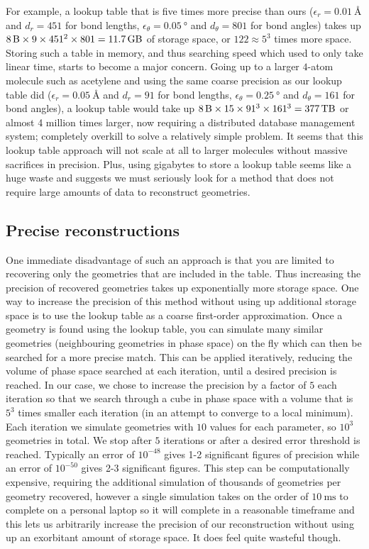 For example, a lookup table that is five times more precise than ours ($\epsilon_r = \SI{0.01}{\angstrom}$ and $d_r = 451$ for bond lengths, $\epsilon_\theta = \SI{0.05}{\degree}$ and $d_\theta = 801$ for bond angles) takes up $\SI{8}{\byte} \times 9 \times 451^2 \times 801 = \SI{11.7}{\giga\byte}$ of storage space, or $122 \approx 5^3$ times more space. Storing such a table in memory, and thus searching speed which used to only take linear time, starts to become a major concern. Going up to a larger $4$-atom molecule such as acetylene and using the same coarse precision as our lookup table did ($\epsilon_r = \SI{0.05}{\angstrom}$ and $d_r = 91$ for bond lengths, $\epsilon_\theta = \SI{0.25}{\degree}$ and $d_\theta = 161$ for bond angles), a lookup table would take up $\SI{8}{\byte} \times 15 \times 91^3 \times 161^3 = \SI{377}{\tera\byte}$ or almost 4 million times larger, now requiring a distributed database management system; completely overkill to solve a relatively simple problem. It seems that this lookup table approach will not scale at all to larger molecules without massive sacrifices in precision. Plus, using gigabytes to store a lookup table seems like a huge waste and suggests we must seriously look for a method that does not require large amounts of data to reconstruct geometries.

\subsection{Precise reconstructions}

One immediate disadvantage of such an approach is that you are limited to recovering only the geometries that are included in the table. Thus increasing the precision of recovered geometries takes up exponentially more storage space. One way to increase the precision of this method without using up additional storage space is to use the lookup table as a coarse first-order approximation. Once a geometry is found using the lookup table, you can simulate many similar geometries (neighbouring geometries in phase space) on the fly which can then be searched for a more precise match. This can be applied iteratively, reducing the volume of phase space searched at each iteration, until a desired precision is reached. In our case, we chose to increase the precision by a factor of $5$ each iteration so that we search through a cube in phase space with a volume that is $5^3$ times smaller each iteration (in an attempt to converge to a local minimum). Each iteration we simulate geometries with $10$ values for each parameter, so $10^3$ geometries in total. We stop after $5$ iterations or after a desired error threshold is reached. Typically an error of $10^{-48}$ gives 1-2 significant figures of precision while an error of $10^{-50}$ gives 2-3 significant figures. This step can be computationally expensive, requiring the additional simulation of thousands of geometries per geometry recovered, however a single simulation takes on the order of $\SI{10}{\ms}$ to complete on a personal laptop so it will complete in a reasonable timeframe and this lets us arbitrarily increase the precision of our reconstruction without using up an exorbitant amount of storage space. It does feel quite wasteful though.

